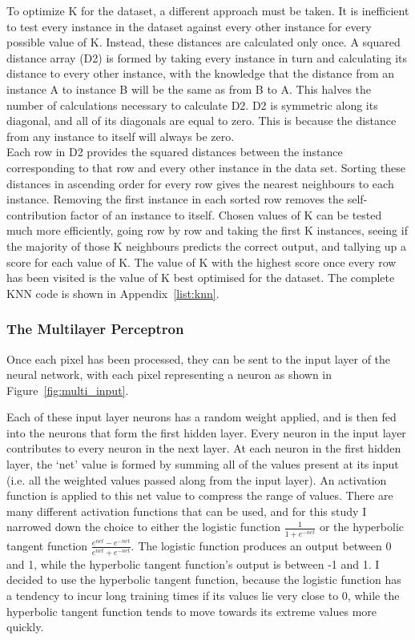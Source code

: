 To optimize K for the dataset, a different approach must be taken. It is inefficient to test every instance in the dataset against every other instance for every possible value of K. Instead, these distances are calculated only once. A squared distance array (D2) is formed by taking every instance in turn and calculating its distance to every other instance, with the knowledge that the distance from an instance A to instance B will be the same as from B to A. This halves the number of calculations necessary to calculate D2. D2 is symmetric along its diagonal, and all of its diagonals are equal to zero. This is because the distance from any instance to itself will always be zero. \\

Each row in D2 provides the squared distances between the instance corresponding to that row and every other instance in the data set. Sorting these distances in ascending order for every row gives the nearest neighbours to each instance. Removing the first instance in each sorted row removes the self-contribution factor of an instance to itself. Chosen values of K can be tested much more efficiently, going row by row and taking the first K instances, seeing if the majority of those K neighbours predicts the correct output, and tallying up a score for each value of K. The value of K with the highest score once every row has been visited is the value of K best optimised for the dataset. The complete KNN code is shown in Appendix~\ref{list:knn}.

\subsubsection{The Multilayer Perceptron}

Once each pixel has been processed, they can be sent to the input layer of the neural network, with each pixel representing a neuron as shown in Figure~\ref{fig:multi_input}.
 
Each of these input layer neurons has a random weight applied, and is then fed into the neurons that form the first hidden layer. Every neuron in the input layer contributes to every neuron in the next layer. At each neuron in the first hidden layer, the `net' value is formed by summing all of the values present at its input (i.e. all the weighted values passed along from the input layer). An activation function is applied to this net value to compress the range of values. There are many different activation functions that can be used, and for this study I narrowed down the choice to either the logistic function $ \frac{1}{1 + e^{-net}} $ or the hyperbolic tangent function $\frac{e^{net} - e^{-net}}{e^{net} + e^{-net}} $. The logistic function produces an output between 0 and 1, while the hyperbolic tangent function's output is between -1 and 1. I decided to use the hyperbolic tangent function, because the logistic function has a tendency to incur long training times if its values lie very close to 0, while the hyperbolic tangent function tends to move towards its extreme values more quickly.  

